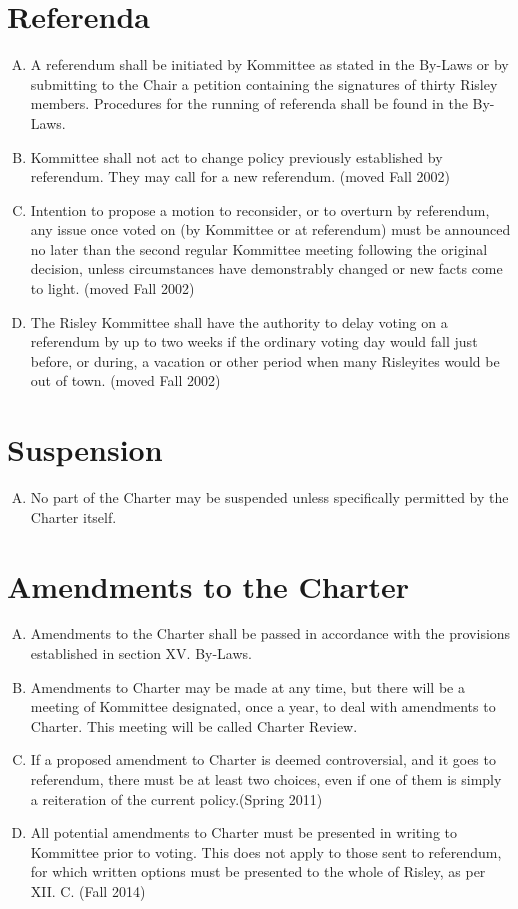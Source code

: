 \documentclass[12pt]{article}
\begin{document}
\section{Referenda}
\begin{enumerate}[A.]
\item A referendum shall be initiated by Kommittee as stated in the By-Laws or by submitting to the Chair a petition containing the signatures of thirty Risley members. Procedures for the running of referenda shall be found in the By-Laws.
\item Kommittee shall not act to change policy previously established by referendum. They may call for a new referendum. (moved Fall 2002)
\item Intention to propose a motion to reconsider, or to overturn by referendum, any issue once voted on (by Kommittee or at referendum) must be announced no later than the second regular Kommittee meeting following the original decision, unless circumstances have demonstrably changed or new facts come to light. (moved Fall 2002)
\item The Risley Kommittee shall have the authority to delay voting on a referendum by up to two weeks if the ordinary voting day would fall just before, or during, a vacation or other period when many Risleyites would be out of town. (moved Fall 2002)
\end{enumerate}
\section{Suspension}
\begin{enumerate}[A.]
\item No part of the Charter may be suspended unless specifically permitted by the Charter itself.
\end{enumerate}
\section{Amendments to the Charter}
\begin{enumerate}[A.]
\item Amendments to the Charter shall be passed in accordance with the provisions established in section XV. By-Laws.
\item Amendments to Charter may be made at any time, but there will be a meeting of Kommittee designated, once a year, to deal with amendments to Charter. This meeting will be called Charter Review.
\item If a proposed amendment to Charter is deemed controversial, and it goes to referendum, there must be at least two choices, even if one of them is simply a reiteration of the current policy.(Spring 2011)
\item All potential amendments to Charter must be presented in writing to Kommittee prior to voting.  This does not apply to those sent to referendum, for which written options must be presented to the whole of Risley, as per XII. C. (Fall 2014)
\end{enumerate}
\end{document}
